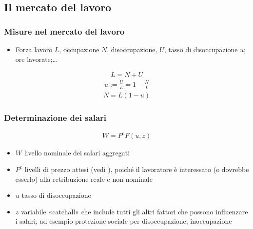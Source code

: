 \documentclass[letterpaper,10pt,italian]{jupyterBook}
\begin{document}
\subsection{Il mercato del lavoro}
\label{\detokenize{ch/macro:il-mercato-del-lavoro}}\label{\detokenize{ch/macro:economics-hs-macro-medium-run-jobs-market}}\label{\detokenize{ch/macro:economics-hs-macro-medium-run-jobs-market-stats}}\subsubsection*{Misure nel mercato del lavoro}
\begin{itemize}
\item {} 
\sphinxAtStartPar
Forza lavoro \(L\), occupazione \(N\), disoccupazione, \(U\), tasso di disoccupazione \(u\); ore lavorate;…

\end{itemize}
\begin{equation*}
\begin{split}L = N + U\end{split}
\end{equation*}\begin{equation*}
\begin{split}u := \frac{U}{L} = 1 - \frac{N}{L}\end{split}
\end{equation*}\begin{equation*}
\begin{split}N = L (1 - u)\end{split}
\end{equation*}\label{\detokenize{ch/macro:economics-hs-macro-medium-run-jobs-market-wages}}\subsubsection*{Determinazione dei salari}
\begin{equation}\label{equation:ch/macro:eq:wages-prices}
\begin{split}W = P^e F(u,z)\end{split}
\end{equation}\begin{itemize}
\item {} 
\sphinxAtStartPar
\(W\) livello nominale dei salari aggregati

\item {} 
\sphinxAtStartPar
\(P^e\) livelli di prezzo attesi (vedi {\hyperref[\detokenize{ch/macro:economics-hs-macro-extra-expectations}]{}}), poiché il lavoratore è interessato (o dovrebbe esserlo) alla retribuzione reale e non nominale

\item {} 
\sphinxAtStartPar
\(u\) tasso di disoccupazione

\item {} 
\sphinxAtStartPar
\(z\) variabile «catchall» che include tutti gli altri fattori che possono influenzare i salari; ad esempio protezione sociale per disoccupazione, inoccupazione

\end{itemize}
\end{document}
